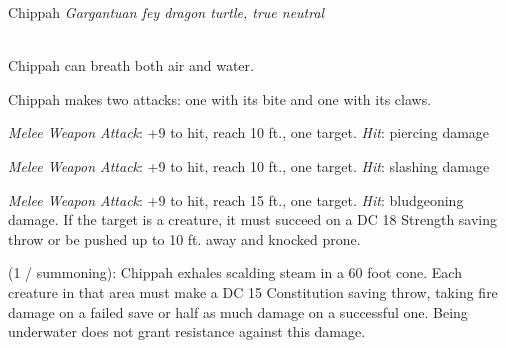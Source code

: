 \documentclass[letterpaper,10pt,twoside,twocolumn,openany]{book}
\begin{document}
\begin{monsterbox}{ Chippah}
	\textit{Gargantuan fey dragon turtle, true neutral}\\
	\hline%
	\basics[%
	armorclass = 17 (natural armor),
	hitpoints  = \dice{14d20 + 55},
	speed      = {20 ft., swim 40 ft.}
	]
	\hline%
	\stats[
    STR = \stat{20}, %
    DEX = \stat{8},
    CON = \stat{20},
    INT = \stat{7},
    WIS = \stat{12},
    CHA = \stat{8}
	]
	\hline%
	\details[%
	skills = {Athletics + 10},
	senses = {darkvision 120 ft., pp 11},
	languages = {Dragon Turtle, understands Common, Draconic, and Sylvan but cannot speak},
	challenge = 4
	]
	\hline \\[1mm]
	\begin{monsteraction}[Amphibious]
		Chippah can breath both air and water.
	\end{monsteraction}
	
	\begin{monsteraction}[Multiattack]
		Chippah makes two attacks: one with its bite and one with its claws.
	\end{monsteraction}
	
	\begin{monsteraction}[Bite]
		\emph{Melee Weapon Attack}: +9 to hit, reach 10 ft., one target. \emph{Hit}:  piercing damage
	\end{monsteraction}

	\begin{monsteraction}[Claw]
		\emph{Melee Weapon Attack}: +9 to hit, reach 10 ft., one target. \emph{Hit}:  slashing damage
	\end{monsteraction}

	\begin{monsteraction}[Tail]
		\emph{Melee Weapon Attack}: +9 to hit, reach 15 ft., one target. \emph{Hit}:  bludgeoning damage.
		If the target is a creature, it must succeed on a DC 18 Strength saving throw or be pushed up to 10 ft. away and knocked prone.
	\end{monsteraction}
	
	\begin{monsteraction}
		(1 / summoning): Chippah exhales scalding steam in a 60 foot cone. Each creature in that area must make a DC 15 Constitution saving throw, taking  fire damage on a failed save or half as much damage on a successful one. 
		Being underwater does not grant resistance against this damage.
	\end{monsteraction}
	
\end{monsterbox}
\end{document}
